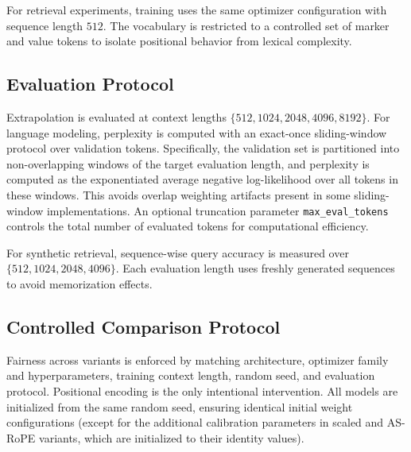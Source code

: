 \documentclass[conference]{IEEEtran}
\begin{document}
For retrieval experiments, training uses the same optimizer configuration with sequence length $512$. The vocabulary is restricted to a controlled set of marker and value tokens to isolate positional behavior from lexical complexity.

\subsection{Evaluation Protocol}
Extrapolation is evaluated at context lengths $\{512, 1024, 2048, 4096, 8192\}$. For language modeling, perplexity is computed with an exact-once sliding-window protocol over validation tokens. Specifically, the validation set is partitioned into non-overlapping windows of the target evaluation length, and perplexity is computed as the exponentiated average negative log-likelihood over all tokens in these windows. This avoids overlap weighting artifacts present in some sliding-window implementations. An optional truncation parameter \texttt{max\_eval\_tokens} controls the total number of evaluated tokens for computational efficiency.

For synthetic retrieval, sequence-wise query accuracy is measured over $\{512, 1024, 2048, 4096\}$. Each evaluation length uses freshly generated sequences to avoid memorization effects.

\subsection{Controlled Comparison Protocol}
Fairness across variants is enforced by matching architecture, optimizer family and hyperparameters, training context length, random seed, and evaluation protocol. Positional encoding is the only intentional intervention. All models are initialized from the same random seed, ensuring identical initial weight configurations (except for the additional calibration parameters in scaled and AS-RoPE variants, which are initialized to their identity values).
\end{document}
